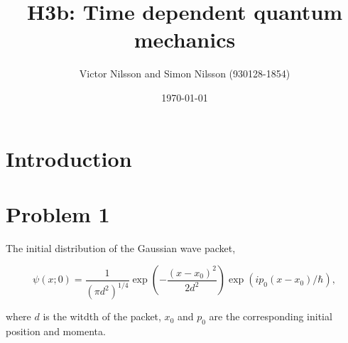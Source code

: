 



\title{H3b: Time dependent quantum mechanics}
\author{Victor Nilsson and Simon Nilsson (930128-1854)}
\date{\today}





\section*{Introduction}

\section*{Problem 1}

The initial distribution of the Gaussian wave packet,

\begin{equation}
	\psi(x;0)=\frac{1}{(\pi d^2)^{1/4}} \exp(-\frac{(x-x_0)^2}{2d^2}) \exp(i p_0(x-x_0)/\hbar),
\end{equation}

where $d$ is the witdth of the packet, $x_0$ and $p_0$ are the corresponding initial position and momenta.

